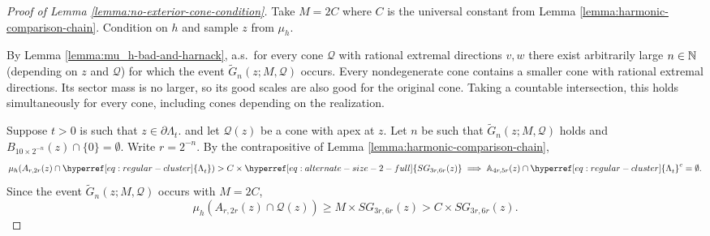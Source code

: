 \documentclass[12pt]{amsart}
\numberwithin{equation}{section}
\newcommand{\regcluster}[2]{\hyperref[eq:regular-cluster]{\Lambda^{#1}_{#2}}}
\newcommand{\SGann}[2]{\hyperref[eq:alternate-size-2-full]{SG_{#1}(#2)}}
\begin{document}
	\begin{proof}[Proof of Lemma \ref{lemma:no-exterior-cone-condition}]
		Take $M = 2 C$ where $C$ is the universal constant from Lemma \ref{lemma:harmonic-comparison-chain}.
		Condition on $h$ and sample $z$ from $\mu_h$. 
		
		By Lemma \ref{lemma:mu_h-bad-and-harnack}, a.s.\ for every cone $\mathcal Q$ with rational extremal directions $v,w$ there exist arbitrarily large $n \in \mathbb{N}$  (depending on $z$ and $\mathcal Q$) for which the event $\tilde G_n(z; M, \mathcal{Q})$ occurs.  
		Every nondegenerate cone contains a smaller cone with rational extremal directions. Its sector mass is no larger, so its good scales are also good for the original cone. Taking a countable intersection, this holds simultaneously for every cone, including cones depending on the realization.
		
		Suppose $t>0$ is such that $z \in \partial {\regcluster{}{t}}$.
		and let $\mathcal Q(z)$ be a cone with apex at $z$. Let $n$ be such that $\tilde G_n(z; M, \mathcal{Q})$ holds
		and $B_{10 \times 2^{-n} }(z) \cap \{0\} = \emptyset$. Write $r = 2^{-n}$. By the contrapositive of Lemma \ref{lemma:harmonic-comparison-chain}, 
		\begin{equation} \label{eq:large-mass-implies-full}
		\mu_h(A_{r, 2r}(z) \cap {\regcluster{}{t}}) > C \times \SGann{3r,6r}{z} \implies \A_{4r, 5r}(z) \cap {{\regcluster{}{t}}}^c = \emptyset.
		\end{equation}
		Since the event $\tilde G_n(z; M, \mathcal{Q})$ occurs with $M = 2C$, 
		\begin{equation} \label{eq:mu_h-is-bad}
		\mu_h(A_{r, 2r}(z) \cap \mathcal{Q}(z)) \geq M \times \SGann{3r,6r}{z} >  C \times \SGann{3r,6r}{z}.
		\end{equation}
		

\end{proof}
\end{document}
